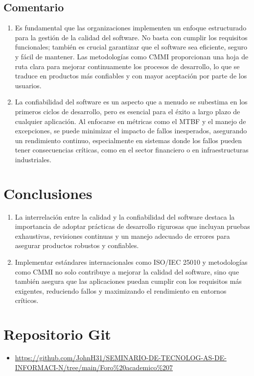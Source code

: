 \documentclass[12pt]{article}
\begin{document}
\subsection*{Comentario}
\begin{enumerate}
    \item Es fundamental que las organizaciones implementen un enfoque estructurado para la gestión de la calidad del software. No basta con cumplir los requisitos funcionales; también es crucial garantizar que el software sea eficiente, seguro y fácil de mantener. Las metodologías como CMMI proporcionan una hoja de ruta clara para mejorar continuamente los procesos de desarrollo, lo que se traduce en productos más confiables y con mayor aceptación por parte de los usuarios.
    \item La confiabilidad del software es un aspecto que a menudo se subestima en los primeros ciclos de desarrollo, pero es esencial para el éxito a largo plazo de cualquier aplicación. Al enfocarse en métricas como el MTBF y el manejo de excepciones, se puede minimizar el impacto de fallos inesperados, asegurando un rendimiento continuo, especialmente en sistemas donde los fallos pueden tener consecuencias críticas, como en el sector financiero o en infraestructuras industriales.
\end{enumerate}

\section*{Conclusiones}
\begin{enumerate}
    \item La interrelación entre la calidad y la confiabilidad del software destaca la importancia de adoptar prácticas de desarrollo rigurosas que incluyan pruebas exhaustivas, revisiones continuas y un manejo adecuado de errores para asegurar productos robustos y confiables.
    \item Implementar estándares internacionales como ISO/IEC 25010 y metodologías como CMMI no solo contribuye a mejorar la calidad del software, sino que también asegura que las aplicaciones puedan cumplir con los requisitos más exigentes, reduciendo fallos y maximizando el rendimiento en entornos críticos.


\end{enumerate}




\section*{Repositorio Git}
\begin{itemize}
    \item \url{https://github.com/JohnH31/SEMINARIO-DE-TECNOLOG-AS-DE-INFORMACI-N/tree/main/Foro%20academico%207}
\end{itemize}
\end{document}
